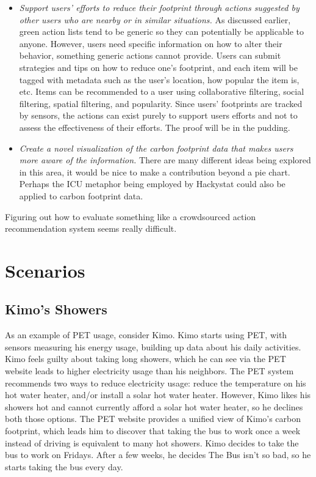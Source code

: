 \begin{itemize}
	\item \emph{Support users' efforts to reduce their footprint through actions suggested by other users who are nearby or in similar situations.} As discussed earlier, green action lists tend to be generic so they can potentially be applicable to anyone. However, users need specific information on how to alter their behavior, something generic actions cannot provide. Users can submit strategies and tips on how to reduce one's footprint, and each item will be tagged with metadata such as the user's location, how popular the item is, etc. Items can be recommended to a user using collaborative filtering, social filtering, spatial filtering, and popularity. Since users' footprints are tracked by sensors, the actions can exist purely to support users efforts and not to assess the effectiveness of their efforts. The proof will be in the pudding.
	
	\item \emph{Create a novel visualization of the carbon footprint data that makes users more aware of the information.} There are many different ideas being explored in this area, it would be nice to make a contribution beyond a pie chart. Perhaps the ICU metaphor being employed by Hackystat could also be applied to carbon footprint data.

\end{itemize}

Figuring out how to evaluate something like a crowdsourced action recommendation system seems really difficult.

\section{Scenarios}

\subsection{Kimo's Showers}

As an example of PET usage, consider Kimo. Kimo starts using PET, with sensors measuring his energy usage, building up data about his daily activities. Kimo feels guilty about taking long showers, which he can see via the PET website leads to higher electricity usage than his neighbors. The PET system recommends two ways to reduce electricity usage: reduce the temperature on his hot water heater, and/or install a solar hot water heater. However, Kimo likes his showers hot and cannot currently afford a solar hot water heater, so he declines both those options. The PET website provides a unified view of Kimo's carbon footprint, which leads him to discover that taking the bus to work once a week instead of driving is equivalent to many hot showers. Kimo decides to take the bus to work on Fridays. After a few weeks, he decides The Bus isn't so bad, so he starts taking the bus every day.